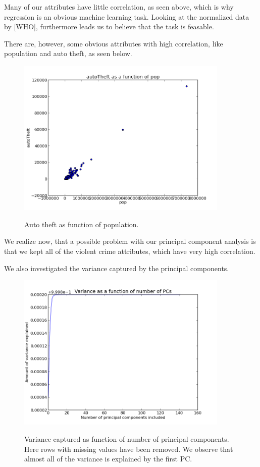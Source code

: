 Many of our attributes have little correlation, as seen above, which is why regression is an obvious machine learning task. Looking at the normalized data by [WHO], furthermore leads us to believe that the task is feasable.

There are, however, some obvious attributes with high correlation, like population and auto theft, as seen below.

\begin{figure}[H]
\centering
\includegraphics[width=0.9\textwidth]{correlations/autoTheft-as-func-of-pop}
\label{fig:prenorm_attrrem_0out}
\caption{Auto theft as function of population.}
\end{figure}

We realize now, that a possible problem with our principal component analysis is that we kept all of the violent crime attributes, which have very high correlation.

We also investigated the variance captured by the principal components.

\begin{figure}[H]
\centering
\includegraphics[width=0.9\textwidth]{variance/variancerows-with-missings-removed_5-biggest-outliers-removed_}
\label{fig:lala}
\caption{Variance captured as function of number of principal components. Here rows with missing values have been removed. We observe that almost all of the variance is explained by the first PC.}
\end{figure}

